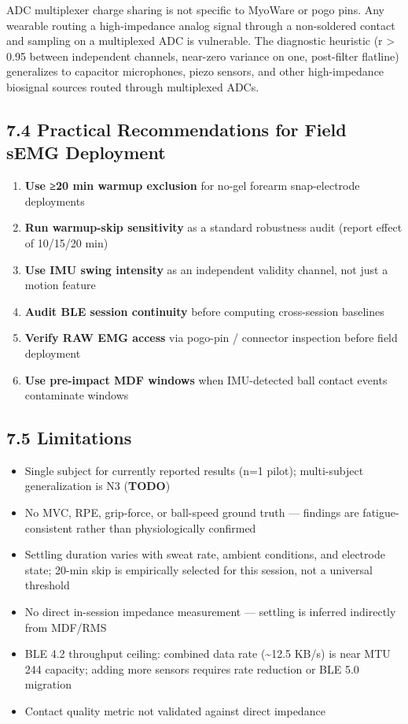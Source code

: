 \documentclass[sensors,article,submit,pdftex,moreauthors]{Definitions/mdpi}
\providecommand{\tightlist}{\setlength{\itemsep}{0pt}\setlength{\parskip}{0pt}}
\begin{document}
ADC multiplexer charge sharing is not specific to MyoWare or pogo pins. Any wearable routing
a high-impedance analog signal through a non-soldered contact and sampling on a multiplexed
ADC is vulnerable. The diagnostic heuristic (r \textgreater{} 0.95 between independent channels, near-zero
variance on one, post-filter flatline) generalizes to capacitor microphones, piezo sensors,
and other high-impedance biosignal sources routed through multiplexed ADCs.

\subsection{7.4 Practical Recommendations for Field sEMG Deployment}\label{practical-recommendations-for-field-semg-deployment}

\begin{enumerate}
\def\labelenumi{\arabic{enumi}.}
\tightlist
\item
  \textbf{Use ≥20 min warmup exclusion} for no-gel forearm snap-electrode deployments
\item
  \textbf{Run warmup-skip sensitivity} as a standard robustness audit (report effect of 10/15/20 min)
\item
  \textbf{Use IMU swing intensity} as an independent validity channel, not just a motion feature
\item
  \textbf{Audit BLE session continuity} before computing cross-session baselines
\item
  \textbf{Verify RAW EMG access} via pogo-pin / connector inspection before field deployment
\item
  \textbf{Use pre-impact MDF windows} when IMU-detected ball contact events contaminate windows
\end{enumerate}

\subsection{7.5 Limitations}\label{limitations}

\begin{itemize}
\tightlist
\item
  Single subject for currently reported results (n=1 pilot); multi-subject generalization is
  N3 (\textbf{TODO})
\item
  No MVC, RPE, grip-force, or ball-speed ground truth --- findings are fatigue-consistent rather
  than physiologically confirmed
\item
  Settling duration varies with sweat rate, ambient conditions, and electrode state; 20-min
  skip is empirically selected for this session, not a universal threshold
\item
  No direct in-session impedance measurement --- settling is inferred indirectly from MDF/RMS
\item
  BLE 4.2 throughput ceiling: combined data rate (\textasciitilde12.5 KB/s) is near MTU 244 capacity;
  adding more sensors requires rate reduction or BLE 5.0 migration
\item
  Contact quality metric not validated against direct impedance
\end{itemize}
\end{document}
